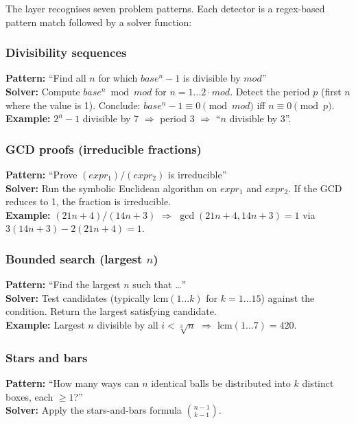 \documentclass[11pt,a4paper]{article}
\begin{document}
The layer recognises seven problem patterns. Each detector is a regex-based pattern match followed by a solver function:

\subsubsection{Divisibility sequences}
\textbf{Pattern:} ``Find all $n$ for which $base^n - 1$ is divisible by $mod$'' \\
\textbf{Solver:} Compute $base^n \bmod mod$ for $n = 1 \ldots 2 \cdot mod$. Detect the period $p$ (first $n$ where the value is 1). Conclude: $base^n - 1 \equiv 0 \pmod{mod}$ iff $n \equiv 0 \pmod{p}$. \\
\textbf{Example:} $2^n - 1$ divisible by 7 $\Rightarrow$ period 3 $\Rightarrow$ ``$n$ divisible by 3''.

\subsubsection{GCD proofs (irreducible fractions)}
\textbf{Pattern:} ``Prove $(expr_1)/(expr_2)$ is irreducible'' \\
\textbf{Solver:} Run the symbolic Euclidean algorithm on $expr_1$ and $expr_2$. If the GCD reduces to 1, the fraction is irreducible. \\
\textbf{Example:} $(21n+4)/(14n+3)$ $\Rightarrow$ $\gcd(21n+4, 14n+3) = 1$ via $3(14n+3) - 2(21n+4) = 1$.

\subsubsection{Bounded search (largest $n$)}
\textbf{Pattern:} ``Find the largest $n$ such that \ldots'' \\
\textbf{Solver:} Test candidates (typically $\mathrm{lcm}(1 \ldots k)$ for $k = 1 \ldots 15$) against the condition. Return the largest satisfying candidate. \\
\textbf{Example:} Largest $n$ divisible by all $i < \sqrt[3]{n}$ $\Rightarrow$ $\mathrm{lcm}(1 \ldots 7) = 420$.

\subsubsection{Stars and bars}
\textbf{Pattern:} ``How many ways can $n$ identical balls be distributed into $k$ distinct boxes, each $\geq 1$?'' \\
\textbf{Solver:} Apply the stars-and-bars formula $\binom{n-1}{k-1}$.
\end{document}
